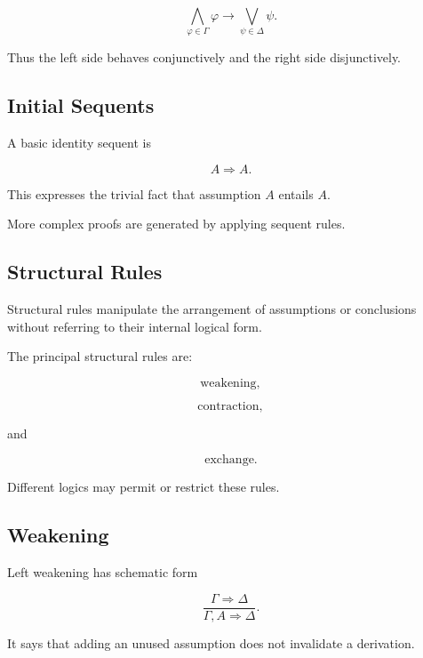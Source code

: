 \[
\boxed{
\bigwedge_{\varphi\in\Gamma}\varphi
\rightarrow
\bigvee_{\psi\in\Delta}\psi.
}
\]

Thus the left side behaves conjunctively and the right side
disjunctively.

\subsection{Initial Sequents}
\label{subsec:initial-sequents}

A basic identity sequent is

\[
\boxed{
A
\Rightarrow
A.
}
\]

This expresses the trivial fact that assumption \(A\) entails \(A\).

More complex proofs are generated by applying sequent rules.

\subsection{Structural Rules}
\label{subsec:structural-rules}

Structural rules manipulate the arrangement of assumptions or conclusions
without referring to their internal logical form.

The principal structural rules are:

\[
\boxed{
\text{weakening},
}
\]

\[
\boxed{
\text{contraction},
}
\]

and

\[
\boxed{
\text{exchange}.
}
\]

Different logics may permit or restrict these rules.

\subsection{Weakening}
\label{subsec:weakening}

Left weakening has schematic form

\[
\boxed{
\frac{
\Gamma\Rightarrow\Delta
}{
\Gamma,A\Rightarrow\Delta
}.
}
\]

It says that adding an unused assumption does not invalidate a derivation.


